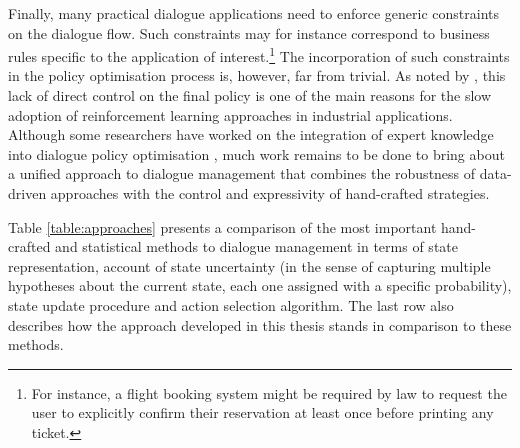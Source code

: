Finally, many practical dialogue applications need to enforce generic constraints on the dialogue flow.  Such constraints may for instance correspond to business rules  specific to the  application of interest.\footnote{For instance, a flight booking system might be required by law to request the user to explicitly confirm their reservation at least once before printing any ticket.} The incorporation of such constraints in the policy optimisation process is, however, far from trivial. As noted by \cite{Paek:2008}, this lack of direct control on the final policy is one of the main reasons for the slow adoption of reinforcement learning approaches in industrial applications.  Although some researchers have worked on the integration of expert knowledge into dialogue policy optimisation \citep{heeman2007,williams2008}, much work remains to be done to bring about a unified approach to dialogue management that combines the robustness of data-driven approaches with the control and expressivity of hand-crafted strategies. 

Table \ref{table:approaches} presents a comparison of the most important hand-crafted and statistical methods to dialogue management in terms of state representation, account of state uncertainty (in the sense of capturing multiple hypotheses about the current state, each one assigned with a specific probability), state update procedure and action selection algorithm.  The last row also describes how the approach developed in this thesis stands in comparison to these methods. 
  
